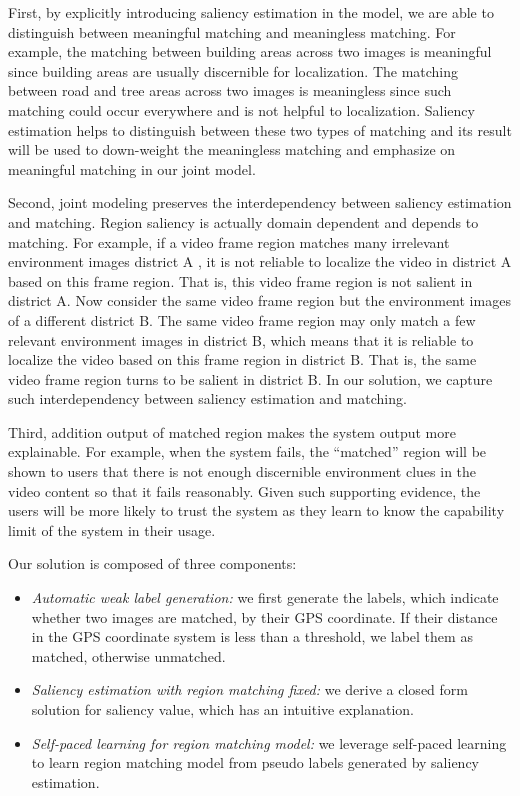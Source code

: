 First, by explicitly introducing saliency estimation in the model, we are able to distinguish between meaningful matching and meaningless matching. 
For example, the matching between building areas across two images is meaningful since building areas are usually discernible for localization. 
The matching between road and tree areas across two images is meaningless since such matching could occur everywhere and is not helpful to localization. 
Saliency estimation helps to distinguish between these two types of matching and its result will be used to down-weight the meaningless matching and emphasize on meaningful matching in our joint model. 

Second, joint modeling preserves the interdependency between saliency estimation and matching. 
Region saliency is actually domain dependent and depends to matching. 
For example, if a video frame region matches many irrelevant environment images district A , it is not reliable to localize the video in district A based on this frame region. 
That is, this video frame region is not salient in district A. 
Now consider the same video frame region but the environment images of a different district B. 
The same video frame region may only match a few relevant environment images in district B, which means that it is reliable to localize the video based on this frame region in district B. 
That is, the same video frame region turns to be salient in district B. 
In our solution, we capture such interdependency between saliency estimation and matching. 

Third, addition output of matched region makes the system output more explainable. 
For example, when the system fails, the ``matched'' region will be shown to users that there is not enough discernible environment clues in the video content so that it fails reasonably. 
Given such supporting evidence, the users will be more likely to trust the system as they learn to know the capability limit of the system in their usage. 

Our solution is composed of three components: 
\begin{itemize}
\item \emph{Automatic weak label generation: } 
we first generate the labels, which indicate whether two images are matched, by their GPS coordinate. If their distance in the GPS coordinate system is less than a threshold, we label them as matched, otherwise unmatched. 
\item \emph{Saliency estimation with region matching fixed: }
we derive a closed form solution for saliency value, which has an intuitive explanation. 
\item \emph{Self-paced learning for region matching model: }
we leverage self-paced learning to learn region matching model from pseudo labels generated by saliency estimation. 
\end{itemize}

